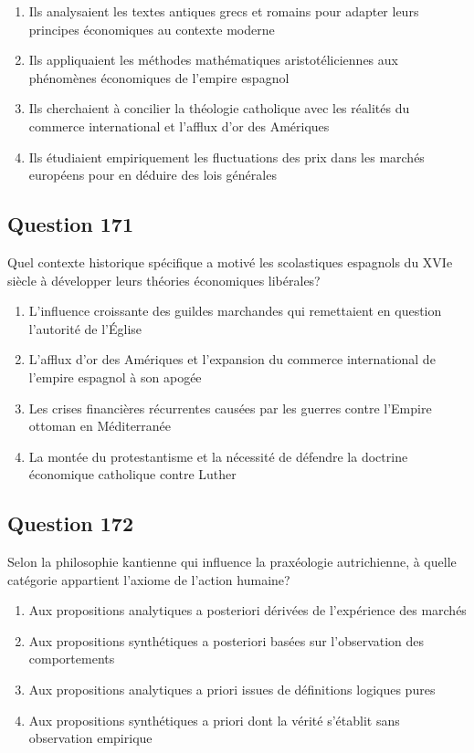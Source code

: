 \documentclass[12pt,a4paper]{article}
\begin{document}
\begin{enumerate}[label=\Alph*., leftmargin=*]
\item Ils analysaient les textes antiques grecs et romains pour adapter leurs principes économiques au contexte moderne
\item Ils appliquaient les méthodes mathématiques aristotéliciennes aux phénomènes économiques de l'empire espagnol
\item Ils cherchaient à concilier la théologie catholique avec les réalités du commerce international et l'afflux d'or des Amériques
\item Ils étudiaient empiriquement les fluctuations des prix dans les marchés européens pour en déduire des lois générales
\end{enumerate}

\bigskip


\subsection*{Question 171}
Quel contexte historique spécifique a motivé les scolastiques espagnols du XVIe siècle à développer leurs théories économiques libérales?

\begin{enumerate}[label=\Alph*., leftmargin=*]
\item L'influence croissante des guildes marchandes qui remettaient en question l'autorité de l'Église
\item L'afflux d'or des Amériques et l'expansion du commerce international de l'empire espagnol à son apogée
\item Les crises financières récurrentes causées par les guerres contre l'Empire ottoman en Méditerranée
\item La montée du protestantisme et la nécessité de défendre la doctrine économique catholique contre Luther
\end{enumerate}

\bigskip


\subsection*{Question 172}
Selon la philosophie kantienne qui influence la praxéologie autrichienne, à quelle catégorie appartient l'axiome de l'action humaine?

\begin{enumerate}[label=\Alph*., leftmargin=*]
\item Aux propositions analytiques a posteriori dérivées de l'expérience des marchés
\item Aux propositions synthétiques a posteriori basées sur l'observation des comportements
\item Aux propositions analytiques a priori issues de définitions logiques pures
\item Aux propositions synthétiques a priori dont la vérité s'établit sans observation empirique
\end{enumerate}
\end{document}
